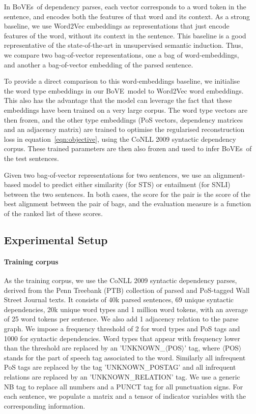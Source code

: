 \documentclass[11pt,a4paper]{article}
\newcommand{\bove}{Bo{\nolinebreak\hspace{-0.25ex}}VE}
\newcommand{\boves}{Bo{\nolinebreak\hspace{-0.25ex}}VEs}
\begin{document}
In \boves\ of dependency parses, each vector corresponds to a word token in
the sentence, and encodes both the features of that word and its context.  As
a strong baseline, we use Word2Vec embeddings as representations that just
encode features of the word, without its context in the sentence.  This
baseline is a good representative of the state-of-the-art in unsupervised
semantic induction.  Thus, we compare two bag-of-vector representations, one a
bag of word-embeddings, and another a bag-of-vector embedding of the parsed
sentence.

To provide a direct comparison to this word-embeddings baseline, we initialise
the word type embeddings in our \bove\ model to Word2Vec word embeddings.
This also has the advantage that the model can leverage the fact that these
embeddings have been trained on a very large corpus.  The word type vectors
are then frozen, and the other type embeddings (PoS vectors, dependency
matrices and an adjacency matrix) are trained to optimise the regularised reconstruction loss in
equation~\ref{eqn:objective}, using the CoNLL 2009 syntactic dependency
corpus.  These trained parameters are then also frozen and used to infer
\boves\ of the test sentences.

Given two bag-of-vector representations for two sentences, we use an
alignment-based model to predict either similarity (for STS) or entailment
(for SNLI) between the two sentences.  In both cases, the score for the pair
is the score of the best alignment between the pair of bags, and the
evaluation measure is a function of the ranked list of these scores.




\subsection{Experimental Setup}


\paragraph{Training corpus}
%
As the training corpus,
we use the CoNLL 2009 \cite{Hajivc09_conll-st} syntactic dependency parses,
derived from the Penn Treebank (PTB) collection of parsed and PoS-tagged Wall
Street Journal texts.  It consists of 40k parsed
sentences, 69 unique syntactic dependencies, 20k unique word types and 1
million word tokens, with an average of 25 word tokens per sentence.  We also
add 1 adjacency relation to the parse graph.  We impose a frequency
threshold of 2 for word types and PoS tags and 1000 for syntactic
dependencies. Word types that appear with frequency lower than the threshold
are replaced by an 'UNKNOWN\_$\langle$POS$\rangle$' tag, where
$\langle$POS$\rangle$ stands for the part of speech tag associated to the
word. Similarly all infrequent PoS tags are replaced by the tag
'UNKNOWN\_POSTAG' and all infrequent relations are replaced by an
'UNKNOWN\_RELATION' tag. We use a generic NB tag to replace all numbers and a
PUNCT tag for all punctuation signs.
For each sentence, we populate a matrix
and a tensor of indicator variables with the corresponding information.
\end{document}
